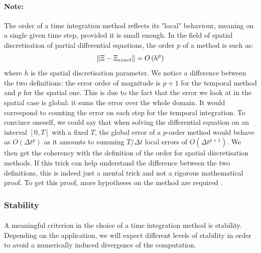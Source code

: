         \paragraph{Note:}
        The order of a time integration method reflects its "local" behaviour, meaning on a single given time step, provided it is small enough.
        In the field of spatial discretisation of partial differential equations, the order $p$ of a method is such as:
        \begin{equation}
          \norm{\Xi - \Xi_{exact}} = O\left(h^p\right)
        \end{equation}
        where $h$ is the spatial discretisation parameter.
        We notice a difference between the two definitions: the error order of magnitude is $p+1$ for the temporal method and $p$ for the spatial one.
        This is due to the fact that the error we look at in the spatial case is global: it sums the error over the whole domain.
        It would correspond to counting the error on each step for the temporal integration.
        To convince oneself, we could say that when solving the differential equation on an interval $\left[0, T\right]$ with a fixed $T$, the global error of a $p$-order method would behave as $O\left(\Delta t^p\right)$ as it amounts to summing $T/\Delta t$ local errors of $O\left(\Delta t^{p+1}\right)$.
        We then get the coherency with the definition of the order for spatial discretisation methods.
        If this trick can help understand the difference between the two definitions, this is indeed just a mental trick and not a rigorous mathematical proof.
        To get this proof, more hypotheses on the method are required \cite{Iserles2008}.


      \subsubsection{Stability}

        \paragraph{}
        A meaningful criterion in the choice of a time integration method is stability.
        Depending on the application, we will expect different levels of stability in order to avoid a numerically induced divergence of the computation.

